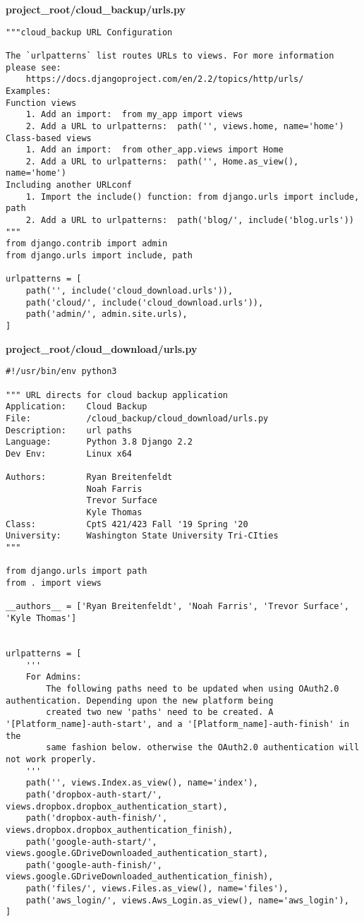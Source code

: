 \documentclass{article}
\begin{document}
\newpage
\textbf{project\_root/cloud\_backup/urls.py}
\begin{verbatim}
"""cloud_backup URL Configuration

The `urlpatterns` list routes URLs to views. For more information please see:
    https://docs.djangoproject.com/en/2.2/topics/http/urls/
Examples:
Function views
    1. Add an import:  from my_app import views
    2. Add a URL to urlpatterns:  path('', views.home, name='home')
Class-based views
    1. Add an import:  from other_app.views import Home
    2. Add a URL to urlpatterns:  path('', Home.as_view(), name='home')
Including another URLconf
    1. Import the include() function: from django.urls import include, path
    2. Add a URL to urlpatterns:  path('blog/', include('blog.urls'))
"""
from django.contrib import admin
from django.urls import include, path

urlpatterns = [
    path('', include('cloud_download.urls')),
    path('cloud/', include('cloud_download.urls')),
    path('admin/', admin.site.urls),
]
\end{verbatim}


\newpage
\textbf{project\_root/cloud\_download/urls.py}
\begin{verbatim}
#!/usr/bin/env python3

""" URL directs for cloud backup application
Application:    Cloud Backup
File:           /cloud_backup/cloud_download/urls.py
Description:    url paths
Language:       Python 3.8 Django 2.2
Dev Env:        Linux x64

Authors:        Ryan Breitenfeldt
                Noah Farris
                Trevor Surface
                Kyle Thomas
Class:          CptS 421/423 Fall '19 Spring '20
University:     Washington State University Tri-CIties
"""

from django.urls import path
from . import views

__authors__ = ['Ryan Breitenfeldt', 'Noah Farris', 'Trevor Surface', 'Kyle Thomas']


urlpatterns = [
    '''
    For Admins:
        The following paths need to be updated when using OAuth2.0 authentication. Depending upon the new platform being 
        created two new 'paths' need to be created. A '[Platform_name]-auth-start', and a '[Platform_name]-auth-finish' in the 
        same fashion below. otherwise the OAuth2.0 authentication will not work properly.
    '''
    path('', views.Index.as_view(), name='index'),
    path('dropbox-auth-start/', views.dropbox.dropbox_authentication_start), 
    path('dropbox-auth-finish/', views.dropbox.dropbox_authentication_finish), 
    path('google-auth-start/', views.google.GDriveDownloaded_authentication_start),
    path('google-auth-finish/', views.google.GDriveDownloaded_authentication_finish),
    path('files/', views.Files.as_view(), name='files'),
    path('aws_login/', views.Aws_Login.as_view(), name='aws_login'),
]
\end{verbatim}
\end{document}
